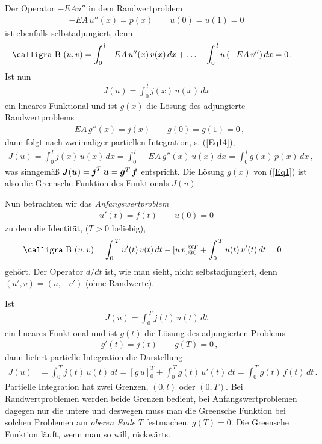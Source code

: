 Der Operator $- EA u''$ in dem Randwertproblem
\begin{align}
- EA\,u''(x) = p(x) \qquad u(0) = u(1) = 0
\end{align}
ist ebenfalls selbstadjungiert, denn
\begin{align}\label{Eq14}
\text{\normalfont\calligra B\,\,}(u,v) &= \int_0^{\,l} - EA\,u''(x)\,v(x)\,dx + \ldots  - \int_0^{\,l} u\,(-EA\,v'') \,dx = 0\,.
\end{align}
Ist nun
\begin{align}
J(u) = \int_0^{\,l} j(x)\,u(x)\,dx
\end{align}
ein lineares Funktional und ist $g(x)$ die L\"{o}sung des adjungierte Randwertproblems
\begin{align} \label{Eq1}
- EA\,g''(x) = j(x) \qquad g(0) = g(1) = 0\,,
\end{align}
dann folgt nach zweimaliger partiellen Integration, s. (\ref{Eq14}),
\begin{align}
J(u) = \int_0^{\,l} j(x)\,u(x)\,dx = \int_0^{\,l}-EA\, g''(x)\,u(x)\,dx = \int_0^{\,l} g(x)\,p(x)\,dx\,,
\end{align}
was sinngem\"{a}{\ss} $\mbox{\boldmath $J$}(\mbox{\boldmath $u$}) = \mbox{\boldmath $j$}^T\,\mbox{\boldmath $u$} = \mbox{\boldmath $g$}^T\,\mbox{\boldmath $f$}$ entspricht. Die L\"{o}sung $g(x)$ von (\ref{Eq1}) ist also die Greensche Funktion des Funktionals $J(u)$.

Nun betrachten wir das {\em Anfangswertproblem\/}
\begin{align}
u'(t) = f(t) \qquad u(0) = 0
\end{align}
zu dem die Identit\"{a}t, ($T > 0$ beliebig),
\begin{align}
\text{\normalfont\calligra B\,\,}(u,v) &= \int_0^{\,T} u'(t)\,v(t)\,dt  - [u\,v]_{@0}^{@T} + \int_0^{\,T} u(t)\,v'(t) \,dt = 0
\end{align}
geh\"{o}rt. Der Operator $d/dt$ ist, wie man sieht, nicht selbstadjungiert, denn $(u',v) = (u,-v')$ (ohne Randwerte).

Ist
\begin{align}
J(u) = \int_0^{\,T} j(t)\,u(t)\,dt
\end{align}
ein lineares Funktional und ist $g(t)$ die L\"{o}sung des adjungierten Problems
\begin{align}
-g'(t) = j(t) \qquad g(T) = 0\,,
\end{align}
dann liefert partielle Integration die Darstellung
\begin{align}
J(u) &= \int_0^{\,T} j(t)\,u(t)\,dt = [g\,u]_0^T + \int_0^{\,T} g(t)\,u'(t)\,dt = \int_0^{\,T} g(t)\,f(t)\,dt\,.
\end{align}
Partielle Integration hat zwei Grenzen, $(0,l)$ oder $(0,T)$. Bei Randwertproblemen werden beide Grenzen bedient, bei Anfangswertproblemen dagegen nur die untere und deswegen muss man die Greensche Funktion bei solchen Problemen am {\em oberen Ende\/} $T$ festmachen, $g(T) = 0$. Die Greensche Funktion l\"{a}uft, wenn man so will, \glq r\"{u}ckw\"{a}rts\grq{}.

